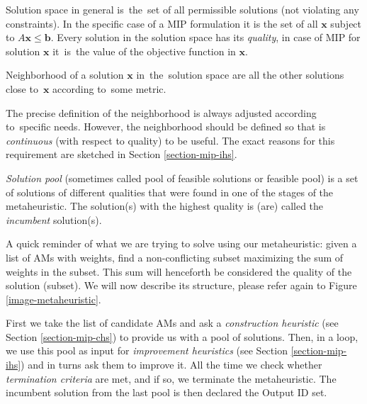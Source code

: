 \begin{define}
	Solution space in general is~the~set of all permissible solutions (not violating any constraints). In the specific case of a MIP formulation it is the set of all $\mathbf{x}$ subject to $A\mathbf{x} \leqslant \mathbf{b}$. Every solution in the solution space has its \textit{quality}, in case of MIP for solution $\mathbf{x}$ it~is~the value of the objective function in $\mathbf{x}$.
\end{define}

\begin{define}
	Neighborhood of a solution $\mathbf{x}$ in~the~solution space are all the other solutions close to~$\mathbf{x}$ according to~some metric.
\end{define}

The precise definition of the neighborhood is always adjusted according to~specific needs. However, the neighborhood should be defined so that is \textit{continuous} (with respect to quality) to be useful. The exact reasons for this requirement are sketched in Section \ref{section-mip-ihs}.

\begin{define}
	\textit{Solution pool} (sometimes called pool of feasible solutions or feasible pool) is a set of solutions of different qualities that were found in one of the stages of the metaheuristic. The solution(s) with the highest quality is (are) called the \textit{incumbent} solution(s).
\end{define}

A quick reminder of what we are trying to solve using our metaheuristic: given a list of AMs with weights, find a non-conflicting subset maximizing the sum of weights in the subset. This sum will henceforth be considered the quality of the solution (subset). We will now describe its structure, please refer again to Figure \ref{image-metaheuristic}.

First we take the list of candidate AMs and ask a \textit{construction heuristic} (see Section \ref{section-mip-chs}) to provide us with a pool of solutions. Then, in a loop, we use this pool as input for \textit{improvement heuristics} (see Section \ref{section-mip-ihs}) and in turns ask them to improve it. All the time we check whether \textit{termination criteria} are met, and if so, we terminate the metaheuristic. The incumbent solution from the last pool is then declared the Output ID set.\\

